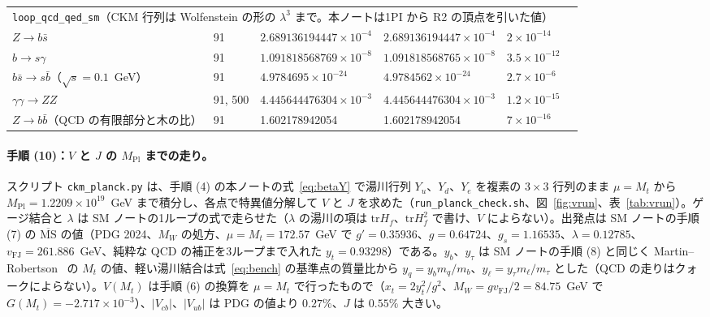 \documentclass[a4paper,10pt]{ltjsarticle}
\newcommand{\MSbar}{\overline{\mathrm{MS}}}
\newcommand{\tr}{\mathrm{tr}}
\begin{document}
\begin{table}[tbp]
\begin{tabular}{llllll}
\midrule
\multicolumn{6}{l}{\texttt{loop\_qcd\_qed\_sm}（CKM 行列は Wolfenstein の形の $\lambda^3$ まで。本ノートは1PI から R2 の頂点を引いた値）} \\
$Z\to b\bar s$ & 91 & $2.689136194447\times10^{-4}$ & $2.689136194447\times10^{-4}$ & $2\times10^{-14}$ & \\
$b\to s\gamma$ & 91 & $1.091818568769\times10^{-8}$ & $1.091818568765\times10^{-8}$ & $3.5\times10^{-12}$ & \\
$b\bar s\to s\bar b$（$\sqrt s=0.1$~GeV） & 91 & $4.9784695\times10^{-24}$ & $4.9784562\times10^{-24}$ & $2.7\times10^{-6}$ & \\
$\gamma\gamma\to ZZ$ & 91, 500 & $4.445644476304\times10^{-3}$ & $4.445644476304\times10^{-3}$ & $1.2\times10^{-15}$ & \\
$Z\to b\bar b$（QCD の有限部分と木の比） & 91 & 1.602178942054 & 1.602178942054 & $7\times10^{-16}$ & \\
\bottomrule
\end{tabular}
\end{table}

\paragraph{手順 (10)：$V$ と $J$ の $M_{\mathrm{Pl}}$ までの走り。}スクリプト \texttt{ckm\_planck.py} は、手順 (4) の本ノートの式~\eqref{eq:betaY} で湯川行列 $Y_u$、$Y_d$、$Y_e$ を複素の $3\times3$ 行列のまま $\mu=M_t$ から $M_{\mathrm{Pl}}=1.2209\times10^{19}$~GeV まで積分し、各点で特異値分解して $V$ と $J$ を求めた（\texttt{run\_planck\_check.sh}、図~\ref{fig:vrun}、表~\ref{tab:vrun}）。ゲージ結合と $\lambda$ は SM ノートの1ループの式で走らせた（$\lambda$ の湯川の項は $\tr H_f$、$\tr H_f^2$ で書け、$V$ によらない）。出発点は SM ノートの手順 (7) の $\MSbar$ の値（PDG 2024、$M_W$ の処方、$\mu=M_t=172.57$~GeV で $g'=0.35936$、$g=0.64724$、$g_s=1.16535$、$\lambda=0.12785$、$v_{\mathrm{FJ}}=261.886$~GeV、純粋な QCD の補正を3ループまで入れた $y_t=0.93298$）である。$y_b$、$y_\tau$ は SM ノートの手順 (8) と同じく Martin--Robertson~\cite{mr19} の $M_t$ の値、軽い湯川結合は式~\eqref{eq:bench} の基準点の質量比から $y_q=y_bm_q/m_b$、$y_\ell=y_\tau m_\ell/m_\tau$ とした（QCD の走りはクォークによらない）。$V(M_t)$ は手順 (6) の換算を $\mu=M_t$ で行ったもので（$x_t=2y_t^2/g^2$、$M_W=gv_{\mathrm{FJ}}/2=84.75$~GeV で $G(M_t)=-2.717\times10^{-3}$）、$|V_{cb}|$、$|V_{ub}|$ は PDG の値より $0.27\%$、$J$ は $0.55\%$ 大きい。
\end{document}
